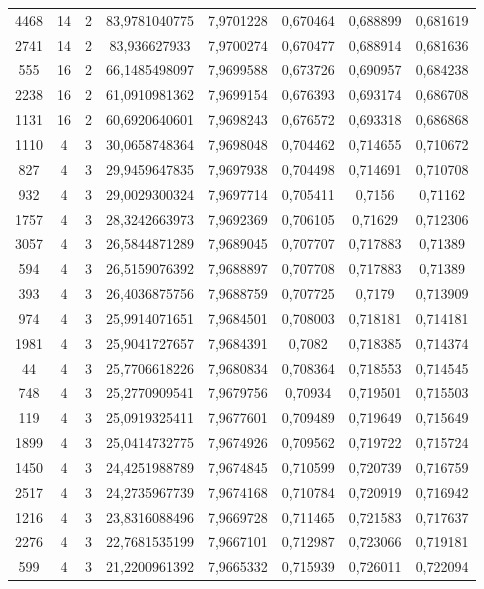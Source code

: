 \begin{longtable}{|c|c|c|c|c|c|c|c|}
4468 & 14 & 2 & 83,9781040775 & 7,9701228 & 0,670464 & 0,688899 & 0,681619 \\
2741 & 14 & 2 & 83,936627933 & 7,9700274 & 0,670477 & 0,688914 & 0,681636 \\
555 & 16 & 2 & 66,1485498097 & 7,9699588 & 0,673726 & 0,690957 & 0,684238 \\
2238 & 16 & 2 & 61,0910981362 & 7,9699154 & 0,676393 & 0,693174 & 0,686708 \\
1131 & 16 & 2 & 60,6920640601 & 7,9698243 & 0,676572 & 0,693318 & 0,686868 \\
1110 & 4 & 3 & 30,0658748364 & 7,9698048 & 0,704462 & 0,714655 & 0,710672 \\
827 & 4 & 3 & 29,9459647835 & 7,9697938 & 0,704498 & 0,714691 & 0,710708 \\
932 & 4 & 3 & 29,0029300324 & 7,9697714 & 0,705411 & 0,7156 & 0,71162 \\
1757 & 4 & 3 & 28,3242663973 & 7,9692369 & 0,706105 & 0,71629 & 0,712306 \\
3057 & 4 & 3 & 26,5844871289 & 7,9689045 & 0,707707 & 0,717883 & 0,71389 \\
594 & 4 & 3 & 26,5159076392 & 7,9688897 & 0,707708 & 0,717883 & 0,71389 \\
393 & 4 & 3 & 26,4036875756 & 7,9688759 & 0,707725 & 0,7179 & 0,713909 \\
974 & 4 & 3 & 25,9914071651 & 7,9684501 & 0,708003 & 0,718181 & 0,714181 \\
1981 & 4 & 3 & 25,9041727657 & 7,9684391 & 0,7082 & 0,718385 & 0,714374 \\
44 & 4 & 3 & 25,7706618226 & 7,9680834 & 0,708364 & 0,718553 & 0,714545 \\
748 & 4 & 3 & 25,2770909541 & 7,9679756 & 0,70934 & 0,719501 & 0,715503 \\
119 & 4 & 3 & 25,0919325411 & 7,9677601 & 0,709489 & 0,719649 & 0,715649 \\
1899 & 4 & 3 & 25,0414732775 & 7,9674926 & 0,709562 & 0,719722 & 0,715724 \\
1450 & 4 & 3 & 24,4251988789 & 7,9674845 & 0,710599 & 0,720739 & 0,716759 \\
2517 & 4 & 3 & 24,2735967739 & 7,9674168 & 0,710784 & 0,720919 & 0,716942 \\
1216 & 4 & 3 & 23,8316088496 & 7,9669728 & 0,711465 & 0,721583 & 0,717637 \\
2276 & 4 & 3 & 22,7681535199 & 7,9667101 & 0,712987 & 0,723066 & 0,719181 \\
599 & 4 & 3 & 21,2200961392 & 7,9665332 & 0,715939 & 0,726011 & 0,722094 \\

\end{longtable}
